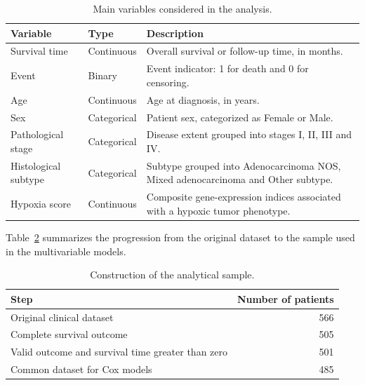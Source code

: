 \documentclass[12pt,a4paper]{article}
\begin{document}
\begin{table}[H]
\centering
\caption{Main variables considered in the analysis.}
\label{tab:variabili_dataset}

\renewcommand{\arraystretch}{1.25}
\setlength{\tabcolsep}{8pt}

\begin{tabularx}{\textwidth}{
    >{\raggedright\arraybackslash}p{3.3cm}
    >{\raggedright\arraybackslash}p{2.4cm}
    >{\raggedright\arraybackslash}X
}
\toprule
\textbf{Variable} & \textbf{Type} & \textbf{Description} \\
\midrule

Survival time
& Continuous
& Overall survival or follow-up time, in months. \\

Event
& Binary
& Event indicator: 1 for death and 0 for censoring. \\

Age
& Continuous
& Age at diagnosis, in years. \\

Sex
& Categorical
& Patient sex, categorized as Female or Male. \\

Pathological stage
& Categorical
& Disease extent grouped into stages I, II, III and IV. \\

Histological subtype
& Categorical
& Subtype grouped into Adenocarcinoma NOS, Mixed adenocarcinoma and Other subtype. \\

Hypoxia score
& Continuous
& Composite gene-expression indices associated with a hypoxic tumor phenotype. \\

\bottomrule
\end{tabularx}
\end{table}

Table~\ref{tab:flusso_pazienti} summarizes the progression from the original dataset to the sample used in the multivariable models.

\begin{table}[H]
\centering
\caption{Construction of the analytical sample.}
\label{tab:flusso_pazienti}

\renewcommand{\arraystretch}{1.2}

\begin{tabular}{l r}
\toprule
\textbf{Step} & \textbf{Number of patients} \\
\midrule
Original clinical dataset & 566 \\
Complete survival outcome & 505 \\
Valid outcome and survival time greater than zero & 501 \\
Common dataset for Cox models & 485 \\
\bottomrule
\end{tabular}
\end{table}
\end{document}
